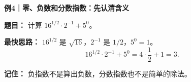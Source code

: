 \begin{examplebox}
    \textbf{\textcolor{CExample}{例4｜零、负数和分数指数：先认清含义}}\par
    \textbf{题目：} 计算 $16^{1/2}\cdot2^{-1}+5^0$。\par
    \textbf{最快思路：} $16^{1/2}$ 是 $\sqrt{16}$，$2^{-1}$ 是 $1/2$，$5^0=1$。
    \[16^{1/2}\cdot2^{-1}+5^0=4\cdot\frac12+1=\boxed{3}.\]
    \begin{center}
    
    \end{center}
    \textbf{记住：} 负指数不是算出负数，分数指数也不是简单的除法。
\end{examplebox}
